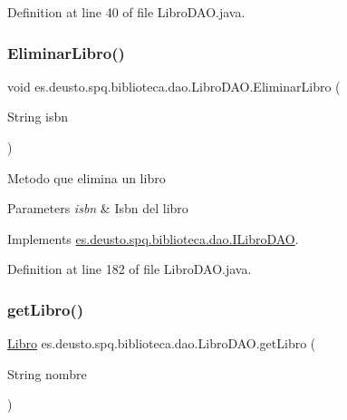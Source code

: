 Definition at line 40 of file Libro\+D\+A\+O.\+java.

\mbox{\label{classes_1_1deusto_1_1spq_1_1biblioteca_1_1dao_1_1_libro_d_a_o_a9c3cfc8c276f20d51bef2af2b204a84a}} 
\subsubsection{\texorpdfstring{Eliminar\+Libro()}{EliminarLibro()}}
{\footnotesize\ttfamily void es.\+deusto.\+spq.\+biblioteca.\+dao.\+Libro\+D\+A\+O.\+Eliminar\+Libro (\begin{DoxyParamCaption}\item[{String}]{isbn }\end{DoxyParamCaption})}

Metodo que elimina un libro 
\begin{DoxyParams}{Parameters}
{\em isbn} & Isbn del libro \\
\hline
\end{DoxyParams}


Implements \mbox{\hyperlink{interfacees_1_1deusto_1_1spq_1_1biblioteca_1_1dao_1_1_i_libro_d_a_o_afb545c6295192e9cde403bf72dbc5818}{es.\+deusto.\+spq.\+biblioteca.\+dao.\+I\+Libro\+D\+AO}}.



Definition at line 182 of file Libro\+D\+A\+O.\+java.

\mbox{\label{classes_1_1deusto_1_1spq_1_1biblioteca_1_1dao_1_1_libro_d_a_o_a9b8af041955b5e4abd0e96b7da68a35a}} 
\subsubsection{\texorpdfstring{get\+Libro()}{getLibro()}}
{\footnotesize\ttfamily \mbox{\hyperlink{classes_1_1deusto_1_1spq_1_1biblioteca_1_1data_1_1_libro}{Libro}} es.\+deusto.\+spq.\+biblioteca.\+dao.\+Libro\+D\+A\+O.\+get\+Libro (\begin{DoxyParamCaption}\item[{String}]{nombre }\end{DoxyParamCaption})}

